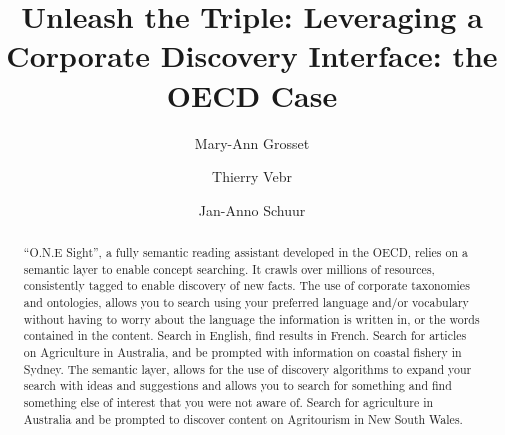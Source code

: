 \documentclass[runningheads,a4paper]{llncs}
\begin{document}
\mainmatter

\title{Unleash the Triple: Leveraging a Corporate Discovery Interface: the OECD Case}
\author{Mary-Ann Grosset \and
Thierry Vebr \and
Jan-Anno Schuur}
\maketitle

\begin{abstract}
``O.N.E Sight'', a fully semantic reading assistant developed in the OECD, relies on a semantic layer to enable concept searching. It crawls over millions of resources, consistently tagged to enable discovery of new facts. The use of corporate taxonomies and ontologies, allows you to search using your preferred language and/or vocabulary without having to worry about the language the information is written in, or the words contained in the content. Search in English, find results in French. Search for articles on Agriculture in Australia, and be prompted with information on coastal fishery in Sydney. The semantic layer, allows for the use of discovery algorithms to expand your search with ideas and suggestions and allows you to search for something and find something else of interest that you were not aware of. Search for agriculture in Australia and be prompted to discover content on Agritourism in New South Wales.

\end{abstract}
\end{document}
